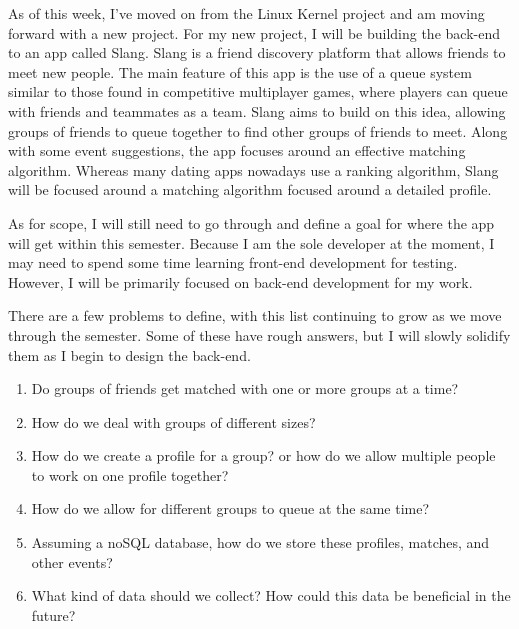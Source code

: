 \documentclass[12pt]{article}
\begin{document}
\setlength{\parindent}{0in}
\addtolength{\parskip}{0.1cm}
\setlength{\fboxrule}{.5mm}\setlength{\fboxsep}{1.2mm}
\newlength{\boxlength}\setlength{\boxlength}{\textwidth}
\addtolength{\boxlength}{-4mm}
\begin{center}
\end{center}
\vspace{2mm}

As of this week, I've moved on from the Linux Kernel project and am moving forward with a new project. For my new project, I will be building the back-end to an app called Slang. Slang is a friend discovery platform that allows friends to meet new people. The main feature of this app is the use of a queue system similar to those found in competitive multiplayer games, where players can queue with friends and teammates as a team. Slang aims to build on this idea, allowing groups of friends to queue together to find other groups of friends to meet. Along with some event suggestions, the app focuses around an effective matching algorithm. Whereas many dating apps nowadays use a ranking algorithm, Slang will be focused around a matching algorithm focused around a detailed profile. 

As for scope, I will still need to go through and define a goal for where the app will get within this semester. Because I am the sole developer at the moment, I may need to spend some time learning front-end development for testing. However, I will be primarily focused on back-end development for my work. 

There are a few problems to define, with this list continuing to grow as we move through the semester. Some of these have rough answers, but I will slowly solidify them as I begin to design the back-end.

\begin{enumerate}
    \item Do groups of friends get matched with one or more groups at a time?
    \item How do we deal with groups of different sizes?
    \item How do we create a profile for a group? or how do we allow multiple people to work on one profile together?
    \item How do we allow for different groups to queue at the same time?
    \item Assuming a noSQL database, how do we store these profiles, matches, and other events?
    \item What kind of data should we collect? How could this data be beneficial in the future?
\end{enumerate}
\end{document}
